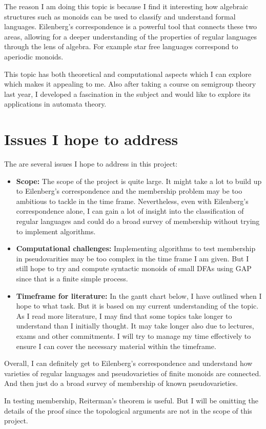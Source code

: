 The reason I am doing this topic is because I find it interesting how algebraic structures such as monoids can be used to classify and understand formal languages.
Eilenberg's correspondence is a powerful tool that connects these two areas, allowing for a deeper understanding of the properties of regular languages through the lens of algebra.
For example star free languages correspond to aperiodic monoids.

This topic has both theoretical and computational aspects which I can explore which makes it appealing to me. Also after taking
a course on semigroup theory last year, I developed a fascination in the subject and would like to explore its applications in automata theory.

\section*{Issues I hope to address}
The are several issues I hope to address in this project:
\begin{itemize}
    \item {\bf Scope:} The scope of the project is quite large. It might take a lot to build up to Eilenberg's correspondence and the membership problem may be too ambitious to tackle in the time frame. 
    Nevertheless, even with Eilenberg's correspondence alone, I can gain a lot of insight into the classification of regular languages and could do a broad survey of membership without trying to implement algorithms.
    \item {\bf Computational challenges:} Implementing algorithms to test membership in pseudovarities may be too complex in the time frame I am given. But I still hope to try and compute syntactic monoids of small DFAs using GAP since that is a finite simple process.
    \item {\bf Timeframe for literature:} In the gantt chart below, I have outlined when I hope to what task. But it is based on my current understanding of the topic. As I read more literature, I may find that some topics take longer to understand than I initially thought.
    It may take longer also due to lectures, exams and other commitments. I will try to manage my time effectively to ensure I can cover the necessary material within the timeframe. 
 \end{itemize}

Overall, I can definitely get to Eilenberg's correspondence and understand how varieties of regular languages and pseudovarieties of finite monoids are connected. And then just do a broad survey of membership of known pseudovarieties.

 In testing membership, Reiterman's theorem is useful. But I will be omitting the details of the proof since the topological arguments are not in the scope of this project.